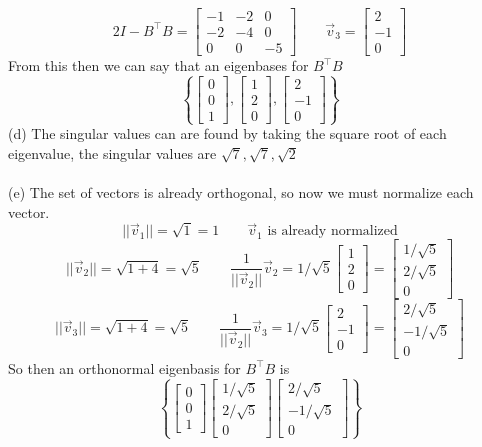 \documentclass{report}
\begin{document}
$$
2I- B^\top B = \begin{bmatrix}
-1&-2&0\\
-2&-4&0\\
0&0&-5
\end{bmatrix}\qquad\vec{v}_3=\begin{bmatrix}2\\-1\\0\end{bmatrix}
$$
From this then we can say that an eigenbases for $B^\top B$
$$
\left\{
\begin{bmatrix}0\\0\\1\end{bmatrix},
\begin{bmatrix}1\\2\\0\end{bmatrix},
\begin{bmatrix}2\\-1\\0\end{bmatrix}
\right\}
$$
(d) The singular values can are found by taking the square root of each eigenvalue, the singular values are $\sqrt{7}, \sqrt{7}, \sqrt{2}$\\
\\
\noindent(e) The set of vectors is already orthogonal, so now we must normalize each vector.
$$
||\vec{v}_1|| = \sqrt{1} = 1 \qquad \vec{v}_1\text{ is already normalized}
$$
$$
||\vec{v}_2|| = \sqrt{1 + 4} = \sqrt{5} \qquad \frac{1}{||\vec{v}_2||}\vec{v}_2 = 1/\sqrt{5}\begin{bmatrix}1\\2\\0\end{bmatrix} = \begin{bmatrix}1/\sqrt{5}\\2/\sqrt{5}\\0\end{bmatrix}
$$
$$
||\vec{v}_3|| = \sqrt{1 + 4} = \sqrt{5} \qquad \frac{1}{||\vec{v}_2||}\vec{v}_3 = 1/\sqrt{5}\begin{bmatrix}2\\-1\\0\end{bmatrix} = \begin{bmatrix}2/\sqrt{5}\\-1/\sqrt{5}\\0\end{bmatrix}
$$
So then an orthonormal eigenbasis for $B^\top B$ is
$$
\left\{
\begin{bmatrix}0\\0\\1\end{bmatrix}
\begin{bmatrix}1/\sqrt{5}\\2/\sqrt{5}\\0\end{bmatrix}
\begin{bmatrix}2/\sqrt{5}\\-1/\sqrt{5}\\0\end{bmatrix}
\right\}
$$
\end{document}
